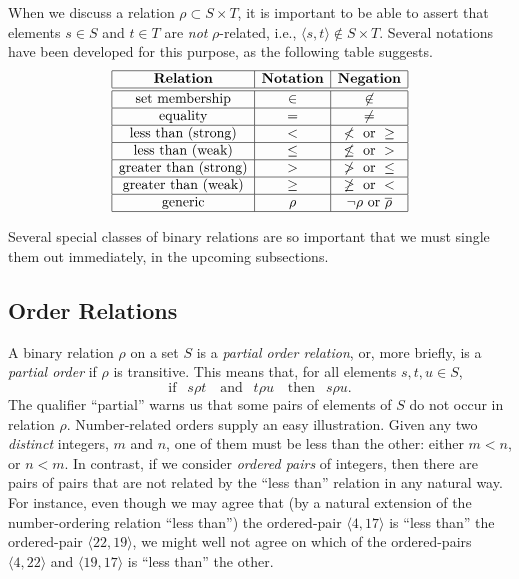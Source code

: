 \noindent
When we discuss a relation $\rho \subset S \times T$, it is important
to be able to assert that elements $s \in S$ and $t \in T$ are {\em
  not} $\rho$-related, i.e., $\langle s, t
\rangle \not\in S \times T$.  Several notations have been developed
for this purpose, as the following table suggests.
\begin{equation}
\label{eq:NOT-rho-notation}
\begin{array}{|c|c|c|c|}
\hline
\mbox{\bf Relation} & \mbox{\bf Notation} & \mbox{\bf Negation}  \\
\hline
\hline
\mbox{set membership} & \in & \not\in  \\
\hline
\mbox{equality}       & =   & \neq     \\
\hline
\mbox{less than (strong)} & < & \not < \mbox{ or } \geq \\
\hline
\mbox{less than (weak)} & \leq & \not\leq \mbox{ or } >  \\
\hline
\mbox{greater than (strong)} & > & \not > \mbox{ or } \leq  \\
\hline
\mbox{greater than (weak)} & \geq & \not\geq \mbox{ or } <  \\
\hline
\mbox{generic}  & \rho  & \neg\rho \mbox{ or } \overline{\rho} \\
\hline
\end{array}
\end{equation}

\medskip

Several special classes of binary relations are so important that we
must single them out immediately, in the upcoming subsections.


\subsection{Order Relations}
\label{sec:order-relation}

A binary relation $\rho$ on a set $S$ is a {\it partial order
  relation},
 or,
more briefly, is a {\it partial order} if $\rho$ is
transitive. This means that, for all
elements $s, t, u \in S$,
\begin{equation}
\label{eq:def-transitive}
\mbox{if } \ \ s \rho t \ \ \ \mbox{ and } \ \ t \rho u \ \ \ \mbox{ then }
\  \ s \rho u.
\end{equation}
The qualifier ``partial'' warns us that some pairs of elements of $S$
do not occur in relation $\rho$.  Number-related orders supply an easy
illustration.  Given any two {\em distinct} integers, $m$ and $n$, one
of them must be less than the other: either $m < n$, or $n < m$.  In
contrast, if we consider {\it ordered pairs} of integers, then there
are pairs of pairs that are not related by the ``less than'' relation
in any natural way.  For instance, even though we may agree that (by a
natural extension of the number-ordering relation ``less than'') the
ordered-pair $\langle 4, 17 \rangle$ is ``less than'' the ordered-pair
$\langle 22, 19 \rangle$, we might well not agree on which of the
ordered-pairs $\langle 4, 22 \rangle$ and $\langle 19, 17 \rangle$ is
``less than'' the other.

